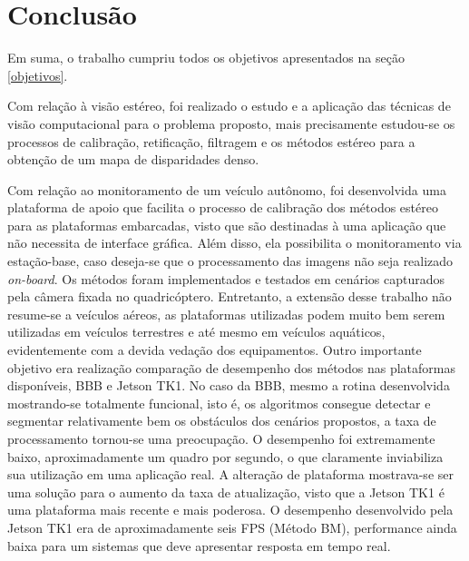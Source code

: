 \chapter{Conclusão}
\label{Conclusao}

Em suma, o trabalho cumpriu todos os objetivos apresentados na seção \ref{objetivos}. 

Com relação à visão estéreo, foi realizado o estudo e a aplicação das técnicas de visão computacional para o problema proposto, mais precisamente estudou-se os processos de calibração, retificação, filtragem e os métodos estéreo para a obtenção de um mapa de disparidades denso. 

Com relação ao monitoramento de um veículo autônomo, foi desenvolvida uma plataforma de apoio que facilita o processo de calibração dos métodos estéreo para as plataformas embarcadas, visto que são destinadas à uma aplicação que não necessita de interface gráfica. Além disso, ela possibilita o monitoramento via estação-base, caso deseja-se que o processamento das imagens não seja realizado \textit{on-board}. Os métodos foram implementados e testados em cenários capturados pela câmera fixada no quadricóptero. Entretanto, a extensão desse trabalho não resume-se a veículos aéreos, as plataformas utilizadas podem muito bem serem utilizadas em veículos terrestres e até mesmo em veículos aquáticos, evidentemente com a devida vedação dos equipamentos. Outro importante objetivo era realização comparação de desempenho dos métodos nas plataformas disponíveis, BBB e Jetson TK1. No caso da BBB, mesmo a rotina desenvolvida mostrando-se totalmente funcional, isto é, os algoritmos consegue detectar e segmentar relativamente bem os obstáculos dos cenários propostos, a taxa de processamento tornou-se uma preocupação. O desempenho foi extremamente baixo, aproximadamente um quadro por segundo, o que claramente inviabiliza sua utilização em uma aplicação real. A alteração de plataforma mostrava-se ser uma solução para o aumento da taxa de atualização, visto que a Jetson TK1 é uma plataforma mais recente e mais poderosa. O desempenho desenvolvido pela Jetson TK1 era de aproximadamente seis FPS (Método BM), performance ainda baixa para um sistemas que deve apresentar resposta em tempo real.

